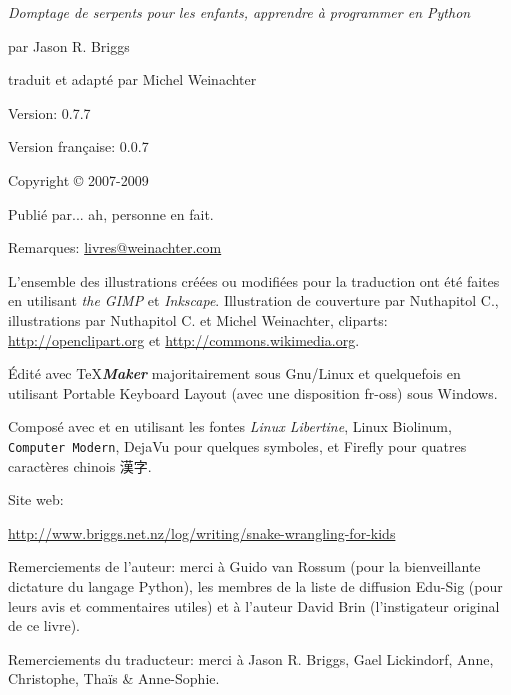 \newpage

\textit{Domptage de serpents pour les enfants, apprendre à programmer en Python}

par Jason R. Briggs

traduit et adapté par Michel Weinachter

\bigskip
Version: 0.7.7

Version française: 0.0.7

\bigskip
Copyright © 2007-2009

\bigskip
Publié par... ah, personne en fait.

\bigskip
Remarques: \href{mailto:livres@weinachter.com?subject=Domptage de serpents pour les enfants}{livres@weinachter.com}

\bigskip
L'ensemble des illustrations créées ou modifiées pour la traduction ont été faites en utilisant \emph{the GIMP} et \emph{Inkscape}.
Illustration de couverture par Nuthapitol C., illustrations par Nuthapitol C. et Michel Weinachter, cliparts:
\url{http://openclipart.org} et \url{http://commons.wikimedia.org}. 

\bigskip
Édité avec \TeX{}{\textbf{\emph{Maker}}} majoritairement sous Gnu/Linux et quelquefois en utilisant Portable Keyboard Layout (avec une disposition fr-oss) sous Windows.
 
Composé avec \XeTeX{} et \XeLaTeX{} en utilisant les fontes \emph{Linux Libertine}, \textsf{Linux Biolinum}, \texttt{Computer Modern}, \setsansfont[Mapping=tex-text]{DejaVu Sans}\textsf{DejaVu} pour quelques symboles, et Firefly pour quatres caractères chinois {%
漢字}.%
 
\bigskip
Site web:

\url{http://www.briggs.net.nz/log/writing/snake-wrangling-for-kids}

\bigskip
Remerciements de l'auteur: merci à Guido van Rossum (pour la bienveillante dictature du langage Python), les membres de la liste de diffusion Edu-Sig (pour leurs avis et commentaires utiles) et à l'auteur David Brin (l'instigateur original de ce livre).

\bigskip
Remerciements du traducteur: merci à Jason R. Briggs, Gael Lickindorf, Anne, Christophe, Thaïs \& Anne-Sophie.

